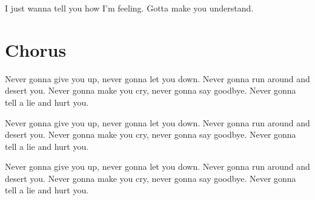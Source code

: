 \documentclass{article}
\begin{document}
I just wanna tell you how I'm feeling.
Gotta make you understand.

\section{Chorus}

Never gonna give you up, never gonna let you down.
Never gonna run around and desert you.
Never gonna make you cry, never gonna say goodbye.
Never gonna tell a lie and hurt you.

Never gonna give you up, never gonna let you down.
Never gonna run around and desert you.
Never gonna make you cry, never gonna say goodbye.
Never gonna tell a lie and hurt you.

Never gonna give you up, never gonna let you down.
Never gonna run around and desert you.
Never gonna make you cry, never gonna say goodbye.
Never gonna tell a lie and hurt you.

\cite{latex2e}
\printbibliography
\end{document}
